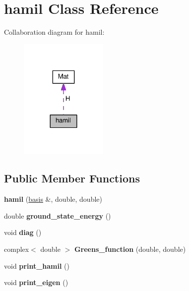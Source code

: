 \hypertarget{classhamil}{}\section{hamil Class Reference}
\label{classhamil}


Collaboration diagram for hamil\+:
\nopagebreak
\begin{figure}[H]
\begin{center}
\leavevmode
\includegraphics[width=120pt]{classhamil__coll__graph}
\end{center}
\end{figure}
\subsection*{Public Member Functions}
\begin{DoxyCompactItemize}
\item 
{\bfseries hamil} (\hyperlink{classbasis}{basis} \&, double, double)\hypertarget{classhamil_aa2c7a2bcca41a671d7210d3d61fdae9e}{}\label{classhamil_aa2c7a2bcca41a671d7210d3d61fdae9e}

\item 
double {\bfseries ground\+\_\+state\+\_\+energy} ()\hypertarget{classhamil_a49c2202b93e45e07636a73679c62e55c}{}\label{classhamil_a49c2202b93e45e07636a73679c62e55c}

\item 
void {\bfseries diag} ()\hypertarget{classhamil_a3e686a737e1019cea6dd3617065a7a7e}{}\label{classhamil_a3e686a737e1019cea6dd3617065a7a7e}

\item 
complex$<$ double $>$ {\bfseries Greens\+\_\+function} (double, double)\hypertarget{classhamil_af3f1cab0e7c3a187df9b48de191c73ef}{}\label{classhamil_af3f1cab0e7c3a187df9b48de191c73ef}

\item 
void {\bfseries print\+\_\+hamil} ()\hypertarget{classhamil_a607d29abc7e23f3097a546b1affa384b}{}\label{classhamil_a607d29abc7e23f3097a546b1affa384b}

\item 
void {\bfseries print\+\_\+eigen} ()\hypertarget{classhamil_ad0939704cbb18eaac49cce5961a28f9d}{}\label{classhamil_ad0939704cbb18eaac49cce5961a28f9d}

\end{DoxyCompactItemize}
